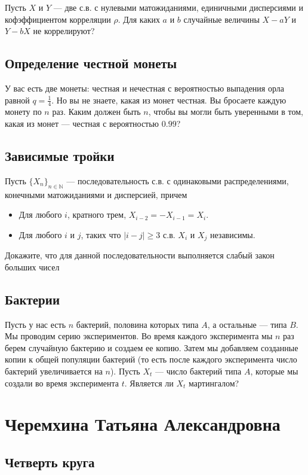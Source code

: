 \documentclass[12pt]{article}
\newcommand\N{\mathbb{N}}
\begin{document}
Пусть $X$ и $Y$ --- две с.в. с нулевыми матожиданиями, единичными дисперсиями и кофэффициентом корреляции $\rho$. Для каких $a$ и $b$ случайные величины $X - aY$ и $Y - bX$ не коррелируют?


\subsection{Определение честной монеты}

У вас есть две монеты: честная и нечестная с вероятностью выпадения орла равной $q = \frac{1}{4}$. Но вы не знаете, какая из монет честная. Вы бросаете каждую монету по $n$ раз. Каким должен быть $n$, чтобы вы могли быть уверенными в том, какая из монет --- честная с вероятностью $0.99$? 


\subsection{Зависимые тройки}
Пусть $\{X_n\}_{n \in \N}$ --- последовательность с.в. с одинаковыми распределениями, конечными матожиданиями и дисперсией, причем
\begin{itemize}
    \item Для любого $i$, кратного трем, $X_{i - 2} = - X_{i - 1} = X_{i}$. 
    \item Для любого $i$ и $j$, таких что $|i - j| \ge 3$ с.в. $X_i$ и $X_j$ независимы.
\end{itemize}
Докажите, что для данной последовательности выполняется слабый закон больших чисел


\subsection{Бактерии}

Пусть у нас есть $n$ бактерий, половина которых типа $A$, а остальные --- типа $B$. Мы проводим серию экспериментов. Во время каждого эксперимента мы $n$ раз берем случайную бактерию и создаем ее копию. Затем мы добавляем созданные копии к общей популяции бактерий (то есть после каждого эксперимента число бактерий увеличивается на $n$). Пусть $X_t$ --- число бактерий типа $A$, которые мы создали во время эксперимента $t$. Является ли $X_t$ мартингалом?


\newpage
\section{Черемхина Татьяна Александровна}

\subsection{Четверть круга}
\end{document}
